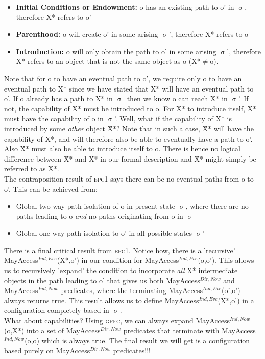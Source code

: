 \documentclass[a4paper,11pt, twoside,twocolumn]{article}
\newcommand{\loneq} {$\neq$}
\newcommand{\losigma}{$\upsigma$}
\begin{document}
\begin{itemize}
\item \textbf{Initial Conditions or Endowment:} o has an existing path to o' in \losigma, therefore X* refers to o'
\item \textbf{Parenthood:} o will create o' in some arising \losigma', therefore X* refers to o
\item \textbf{Introduction:} o will only obtain the path to o' in some arising \losigma', therefore X* refers to an object that is not the same object as o (X*\loneq o). 
\end{itemize}
Note that for o to have an eventual path to o', we require only o to have an eventual path to X* since we have stated that X* will have an eventual path to o'. If o already has a path to X* in \losigma\ then we know o can reach X* in \losigma'. If not, the capability of X* must be introduced to o. For X* to introduce itself, X* must have the capability of o in \losigma'. Well, what if the capability of X* is introduced by some \textit{other} object \~X*? Note that in such a case, \~X* will have the capability of X*, and will therefore also be able to eventually have a path to o'. Also \~X* must also be able to introduce itself to o. There is hence no logical difference between \~X* and X* in our formal description and \~X* might simply be referred to as X*.\\

The contraposition result of \textsc{epc1} says there can be no eventual paths from o to o'. This can be achieved from:
\begin{itemize}
\item Global two-way path isolation of o in present state \losigma, where there are no paths leading to o \textit{and} no paths originating from o in \losigma
\item Global one-way path isolation to o' in all possible states \losigma'\end{itemize}
There is a final critical result from \textsc{epc1}.
Notice how, there is a 'recursive' MayAccess$^{Ind,Eve}$(X*,o') in our condition for MayAccess$^{Ind,Eve}$(o,o').
This allows us to recursively 'expand' the condition to incorporate \textit{all} X* intermediate objects in the path leading to o' that gives us both MayAccess$^{Dir,Now}$ and MayAccess$^{Ind,Now}$ predicates, where the terminating MayAccess$^{Ind,Eve}$(o',o') always returns true. This result allows us to define MayAccess$^{Ind,Eve}$(X*,o') in a configuration completely based in \losigma.\\
What about capabilities? Using \textsc{gpec}, we can always expand MayAccess$^{Ind, Now}$(o,X*) into a set of MayAccess$^{Dir, Now}$ predicates that terminate with MayAccess$^{Ind, Now}$(o,o) which is always true. The final result we will get is a configuration based purely on MayAccess$^{Dir, Now}$ predicates!!!
\end{document}
